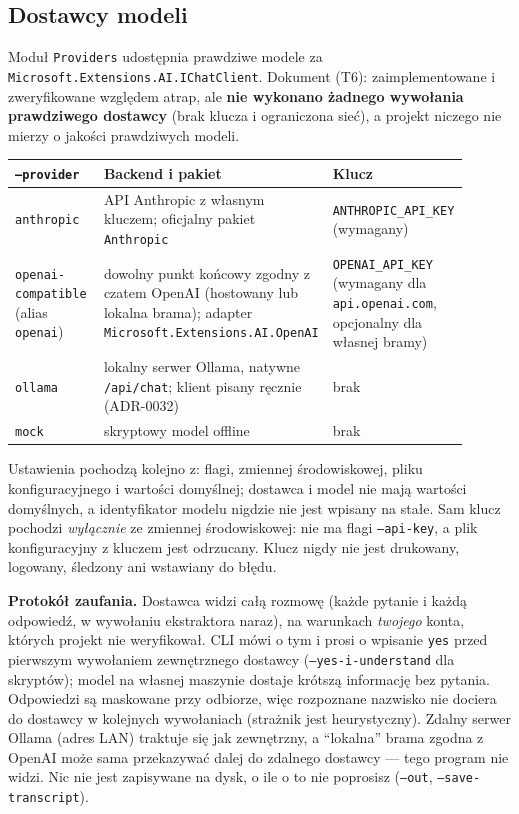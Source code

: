 \subsection{Dostawcy modeli}

Moduł \texttt{Providers} udostępnia prawdziwe modele za
\texttt{Microsoft.Extensions.AI.IChatClient}. Dokument
 (T6): zaimplementowane i
zweryfikowane względem atrap, ale \textbf{nie wykonano żadnego wywołania
prawdziwego dostawcy} (brak klucza i ograniczona sieć), a projekt niczego nie
mierzy o jakości prawdziwych modeli.

\begin{longtable}{@{}p{0.2\linewidth}p{0.4\linewidth}p{0.3\linewidth}@{}}
\toprule
\texttt{--provider} & Backend i pakiet & Klucz \\
\midrule
\endhead
\texttt{anthropic} & API Anthropic z własnym kluczem; oficjalny pakiet
  \texttt{Anthropic} & \texttt{ANTHROPIC\_API\_KEY} (wymagany) \\
\texttt{openai-compatible} (alias \texttt{openai}) & dowolny punkt końcowy
  zgodny z czatem OpenAI (hostowany lub lokalna brama); adapter
  \texttt{Microsoft.Extensions.AI.OpenAI} & \texttt{OPENAI\_API\_KEY}
  (wymagany dla \texttt{api.openai.com}, opcjonalny dla własnej bramy) \\
\texttt{ollama} & lokalny serwer Ollama, natywne \texttt{/api/chat}; klient
  pisany ręcznie (ADR-0032) & brak \\
\texttt{mock} & skryptowy model offline & brak \\
\bottomrule
\end{longtable}

Ustawienia pochodzą kolejno z: flagi, zmiennej środowiskowej, pliku
konfiguracyjnego i wartości domyślnej; dostawca i model nie mają wartości
domyślnych, a identyfikator modelu nigdzie nie jest wpisany na stałe.
Sam klucz pochodzi \emph{wyłącznie} ze zmiennej środowiskowej: nie ma flagi
\texttt{--api-key}, a plik konfiguracyjny z kluczem jest odrzucany. Klucz nigdy
nie jest drukowany, logowany, śledzony ani wstawiany do błędu.

\textbf{Protokół zaufania.} Dostawca widzi całą rozmowę (każde pytanie i każdą
odpowiedź, w wywołaniu ekstraktora naraz), na warunkach \emph{twojego} konta,
których projekt nie weryfikował. CLI mówi o tym i prosi o wpisanie \texttt{yes}
przed pierwszym wywołaniem zewnętrznego dostawcy (\texttt{--yes-i-understand}
dla skryptów); model na własnej maszynie dostaje krótszą informację bez pytania.
Odpowiedzi są maskowane przy odbiorze, więc rozpoznane nazwisko nie dociera do
dostawcy w kolejnych wywołaniach (strażnik jest heurystyczny). Zdalny serwer
Ollama (adres LAN) traktuje się jak zewnętrzny, a ``lokalna'' brama zgodna z
OpenAI może sama przekazywać dalej do zdalnego dostawcy --- tego program nie
widzi. Nic nie jest zapisywane na dysk, o ile o to nie poprosisz
(\texttt{--out}, \texttt{--save-transcript}).

